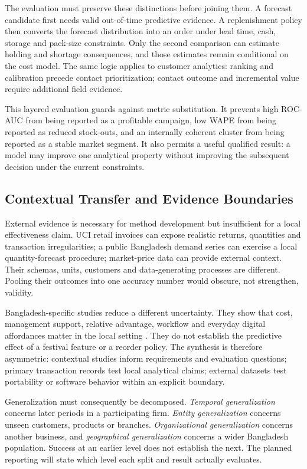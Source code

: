The evaluation must preserve these distinctions before joining them. A forecast
candidate first needs valid out-of-time predictive evidence. A replenishment
policy then converts the forecast distribution into an order under lead time,
cash, storage and pack-size constraints. Only the second comparison can estimate
holding and shortage consequences, and those estimates remain conditional on
the cost model. The same logic applies to customer analytics: ranking and
calibration precede contact prioritization; contact outcome and incremental
value require additional field evidence.

This layered evaluation guards against metric substitution. It prevents high
ROC-AUC from being reported as a profitable campaign, low WAPE from being
reported as reduced stock-outs, and an internally coherent cluster from being
reported as a stable market segment. It also permits a useful qualified result:
a model may improve one analytical property without improving the subsequent
decision under the current constraints.

\subsection{Contextual Transfer and Evidence Boundaries}

External evidence is necessary for method development but insufficient for a
local effectiveness claim. UCI retail invoices can expose realistic returns,
quantities and transaction irregularities; a public Bangladesh demand series
can exercise a local quantity-forecast procedure; market-price data can provide
external context. Their schemas, units, customers and data-generating processes
are different. Pooling their outcomes into one accuracy number would obscure,
not strengthen, validity.

Bangladesh-specific studies reduce a different uncertainty. They show that
cost, management support, relative advantage, workflow and everyday digital
affordances matter in the local setting
\cite{hoque2016ict,shahadat2023digital,hazra2021mfs}. They do not establish the
predictive effect of a festival feature or a reorder policy. The synthesis is
therefore asymmetric: contextual studies inform requirements and evaluation
questions; primary transaction records test local analytical claims; external
datasets test portability or software behavior within an explicit boundary.

Generalization must consequently be decomposed. \emph{Temporal
generalization} concerns later periods in a participating firm. \emph{Entity
generalization} concerns unseen customers, products or branches.
\emph{Organizational generalization} concerns another business, and
\emph{geographical generalization} concerns a wider Bangladesh population.
Success at an earlier level does not establish the next. The planned reporting
will state which level each split and result actually evaluates.

